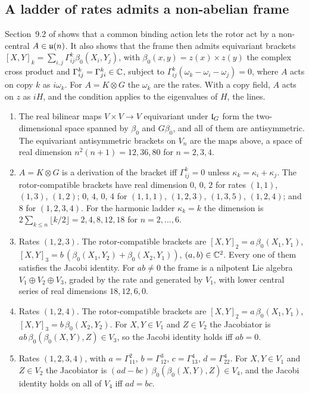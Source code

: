 \subsection{A ladder of rates admits a non-abelian frame}
\label{e4:sec:rotor}

Section~9.2 of \cite{RE} shows that a common binding action lets the rotor act by a non-central $A\in\mathfrak{u}(n)$. It also shows that the frame then
admits equivariant brackets $[X,Y]_k=\sum_{i,j}\Gamma^k_{ij}\beta_0(X_i,Y_j)$, with $\beta_0(x,y)=z(x)\times z(y)$ the complex cross product and
$\Gamma^k_{ij}=\Gamma^k_{ji}\in\mathbb{C}$, subject to $\Gamma^k_{ij}(\omega_k-\omega_i-\omega_j)=0$, where $A$ acts on copy $k$ as $i\omega_k$. For $A=K\otimes G$ the
$\omega_k$ are the rates. With a copy field, $A$ acts on $z$ as $iH$, and the condition applies to the eigenvalues of $H$, the lines.

\begin{proposition}
\label{e4:prop:rotor}
\begin{enumerate}[label=(\roman*),leftmargin=2.2em]
\item The real bilinear maps $V\times V\to V$ equivariant under $\mathfrak l_G$ form the two-dimensional space spanned by $\beta_0$ and $G\beta_0$, and all of them
are antisymmetric. The equivariant antisymmetric brackets on $V_n$ are the maps above, a space of real dimension $n^2(n+1)=12,36,80$ for $n=2,3,4$.
\item $A=K\otimes G$ is a derivation of the bracket iff $\Gamma^k_{ij}=0$ unless $\kappa_k=\kappa_i+\kappa_j$. The rotor-compatible brackets have real dimension
$0$, $0$, $2$ for rates $(1,1)$, $(1,3)$, $(1,2)$; $0$, $4$, $0$, $4$ for $(1,1,1)$, $(1,2,3)$, $(1,3,5)$, $(1,2,4)$; and $8$ for $(1,2,3,4)$. For the
harmonic ladder $\kappa_k=k$ the dimension is $2\sum_{k\le n}\lfloor k/2\rfloor=2,4,8,12,18$ for $n=2,\dots,6$.
\item Rates $(1,2,3)$. The rotor-compatible brackets are $[X,Y]_2=a\,\beta_0(X_1,Y_1)$, $[X,Y]_3=b\,(\beta_0(X_1,Y_2)+\beta_0(X_2,Y_1))$, $(a,b)\in\mathbb{C}^2$. Every one of them
satisfies the Jacobi identity. For $ab\neq0$ the frame is a nilpotent Lie algebra $V_1\oplus V_2\oplus V_3$, graded by the rate and generated by $V_1$, with
lower central series of real dimensions $18,12,6,0$.
\item Rates $(1,2,4)$. The rotor-compatible brackets are $[X,Y]_2=a\,\beta_0(X_1,Y_1)$, $[X,Y]_3=b\,\beta_0(X_2,Y_2)$. For $X,Y\in V_1$ and $Z\in V_2$ the
Jacobiator is $ab\,\beta_0(\beta_0(X,Y),Z)\in V_3$, so the Jacobi identity holds iff $ab=0$.
\item Rates $(1,2,3,4)$, with $a=\Gamma^2_{11}$, $b=\Gamma^3_{12}$, $c=\Gamma^4_{13}$, $d=\Gamma^4_{22}$. For $X,Y\in V_1$ and $Z\in V_2$ the Jacobiator is
$(ad-bc)\,\beta_0(\beta_0(X,Y),Z)\in V_4$, and the Jacobi identity holds on all of $V_4$ iff $ad=bc$.
\end{enumerate}
\end{proposition}

